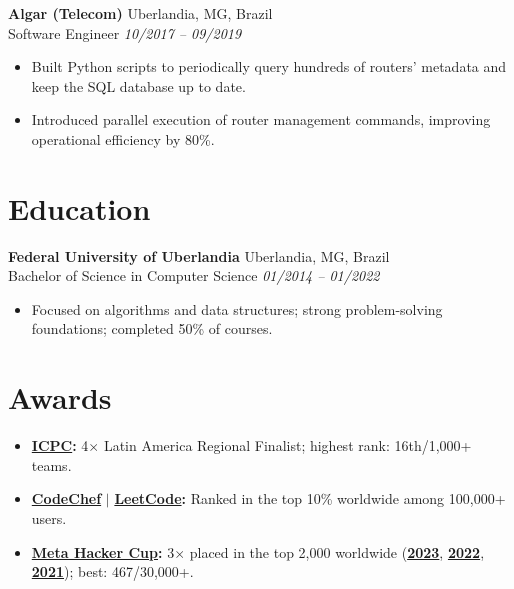 \documentclass[a4paper,10pt]{article}
\begin{document}
\textbf{Algar (Telecom)}
    \hfill Uberlandia, MG, Brazil\\
Software Engineer
    \hfill \textit{10/2017 -- 09/2019}
\begin{itemize}
    \item Built Python scripts to periodically query hundreds of routers' metadata and keep the SQL database up to date.
    \item Introduced parallel execution of router management commands, improving operational efficiency by 80\%.
\end{itemize}

\section*{Education}

\textbf{Federal University of Uberlandia}
    \hfill Uberlandia, MG, Brazil\\
Bachelor of Science in Computer Science
    \hfill \textit{01/2014 -- 01/2022}
\begin{itemize}
    \item Focused on algorithms and data structures; strong problem-solving foundations; completed 50\% of courses.
\end{itemize}

\section*{Awards}

\begin{itemize}
    \item \textbf{\href{https://icpc.global/ICPCID/SP7WIXMME8B8}{ICPC}:} 4$\times$ Latin America Regional Finalist; highest rank: 16th/1,000+ teams.
    \item \textbf{\href{https://www.codechef.com/users/gardusig}{CodeChef}}
        $|$ \textbf{\href{https://leetcode.com/u/ggardusi/}{LeetCode}:}
        Ranked in the top 10\% worldwide among 100,000+ users.
    \item \textbf{\href{https://www.facebook.com/codingcompetitions/hacker-cup}{Meta Hacker Cup}:}
        3$\times$ placed in the top 2,000 worldwide
        (\textbf{\href{https://www.facebook.com/codingcompetitions/hacker-cup/2023/certificate/490890632182886}{2023}},
        \textbf{\href{https://www.facebook.com/codingcompetitions/hacker-cup/2022/certificate/490890632182886}{2022}},
        \textbf{\href{https://www.facebook.com/codingcompetitions/hacker-cup/2021/certificate/490890632182886}{2021}});
        best: 467/30,000+.
\end{itemize}
\end{document}
